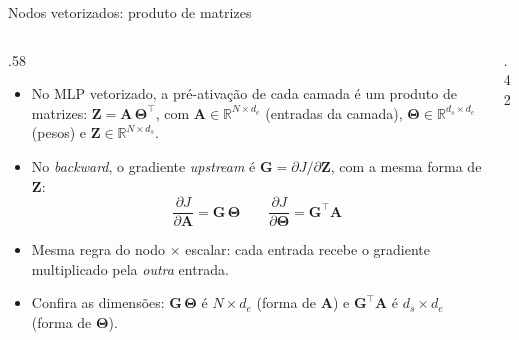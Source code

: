 \documentclass[aspectratio=169,xcolor=dvipsnames]{beamer}
\begin{document}
  \begin{frame}{Nodos vetorizados: produto de matrizes}
    \begin{columns}
      \begin{column}{.58\linewidth}
        \begin{itemize}
          \item No MLP vetorizado, a pré-ativação de cada camada é um produto
            de matrizes: $\mathbf{Z} = \mathbf{A}\,\mathbf{\Theta}^{\top}$, com
            $\mathbf{A} \in \mathbb{R}^{N\times d_e}$ (entradas da camada),
            $\mathbf{\Theta} \in \mathbb{R}^{d_s\times d_e}$ (pesos) e
            $\mathbf{Z} \in \mathbb{R}^{N\times d_s}$.
          \item No \textit{backward}, o gradiente \textit{upstream} é
            $\mathbf{G} = \partial J/\partial \mathbf{Z}$, com a mesma forma de $\mathbf{Z}$:
            \[
              \frac{\partial J}{\partial \mathbf{A}} = \mathbf{G}\,\mathbf{\Theta}
              \qquad
              \frac{\partial J}{\partial \mathbf{\Theta}} = \mathbf{G}^{\top}\mathbf{A}
            \]
          \item Mesma regra do nodo $\times$ escalar: cada entrada
            recebe o gradiente multiplicado pela \textit{outra} entrada.
          \item Confira as dimensões: $\mathbf{G}\,\mathbf{\Theta}$ é $N\times d_e$ (forma de $\mathbf{A}$)
            e $\mathbf{G}^{\top}\mathbf{A}$ é $d_s\times d_e$ (forma de $\mathbf{\Theta}$).
        \end{itemize}
      \end{column}
      \begin{column}{.42\linewidth}
        \centering
      \end{column}
    \end{columns}
  \end{frame}
\end{document}
